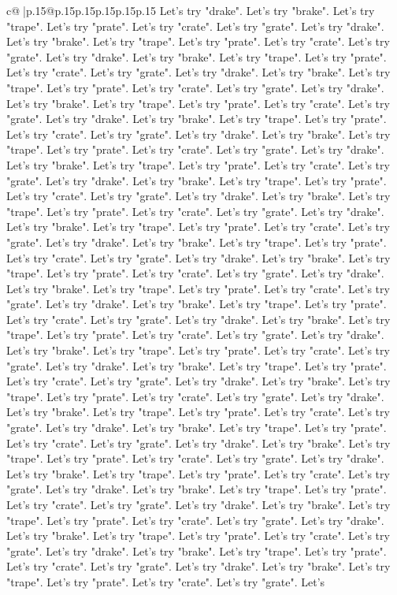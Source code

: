 \documentclass{article}
\begin{document}
{\begin{supertabular}{c@{$\;$}|p{.15\linewidth}@{}p{.15\linewidth}p{.15\linewidth}p{.15\linewidth}p{.15\linewidth}p{.15\linewidth}}
{{{Let's try "drake". Let's try "brake". Let's try "trape". Let's try "prate". Let's try "crate". Let's try "grate". Let's try "drake". Let's try "brake". Let's try "trape". Let's try "prate". Let's try "crate". Let's try "grate". Let's try "drake". Let's try "brake". Let's try "trape". Let's try "prate". Let's try "crate". Let's try "grate". Let's try "drake". Let's try "brake". Let's try "trape". Let's try "prate". Let's try "crate". Let's try "grate". Let's try "drake". Let's try "brake". Let's try "trape". Let's try "prate". Let's try "crate". Let's try "grate". Let's try "drake". Let's try "brake". Let's try "trape". Let's try "prate". Let's try "crate". Let's try "grate". Let's try "drake". Let's try "brake". Let's try "trape". Let's try "prate". Let's try "crate". Let's try "grate". Let's try "drake". Let's try "brake". Let's try "trape". Let's try "prate". Let's try "crate". Let's try "grate". Let's try "drake". Let's try "brake". Let's try "trape". Let's try "prate". Let's try "crate". Let's try "grate". Let's try "drake". Let's try "brake". Let's try "trape". Let's try "prate". Let's try "crate". Let's try "grate". Let's try "drake". Let's try "brake". Let's try "trape". Let's try "prate". Let's try "crate". Let's try "grate". Let's try "drake". Let's try "brake". Let's try "trape". Let's try "prate". Let's try "crate". Let's try "grate". Let's try "drake". Let's try "brake". Let's try "trape". Let's try "prate". Let's try "crate". Let's try "grate". Let's try "drake". Let's try "brake". Let's try "trape". Let's try "prate". Let's try "crate". Let's try "grate". Let's try "drake". Let's try "brake". Let's try "trape". Let's try "prate". Let's try "crate". Let's try "grate". Let's try "drake". Let's try "brake". Let's try "trape". Let's try "prate". Let's try "crate". Let's try "grate". Let's try "drake". Let's try "brake". Let's try "trape". Let's try "prate". Let's try "crate". Let's try "grate". Let's try "drake". Let's try "brake". Let's try "trape". Let's try "prate". Let's try "crate". Let's try "grate". Let's try "drake". Let's try "brake". Let's try "trape". Let's try "prate". Let's try "crate". Let's try "grate". Let's try "drake". Let's try "brake". Let's try "trape". Let's try "prate". Let's try "crate". Let's try "grate". Let's try "drake". Let's try "brake". Let's try "trape". Let's try "prate". Let's try "crate". Let's try "grate". Let's try "drake". Let's try "brake". Let's try "trape". Let's try "prate". Let's try "crate". Let's try "grate". Let's try "drake". Let's try "brake". Let's try "trape". Let's try "prate". Let's try "crate". Let's try "grate". Let's try "drake". Let's try "brake". Let's try "trape". Let's try "prate". Let's try "crate". Let's try "grate". Let's try "drake". Let's try "brake". Let's try "trape". Let's try "prate". Let's try "crate". Let's try "grate". Let's try "drake". Let's try "brake". Let's try "trape". Let's try "prate". Let's try "crate". Let's try "grate". Let's try "drake". Let's try "brake". Let's try "trape". Let's try "prate". Let's try "crate". Let's try "grate". Let's try "drake". Let's try "brake". Let's try "trape". Let's try "prate". Let's try "crate". Let's try "grate". Let's }}}
\end{supertabular}}
\end{document}
